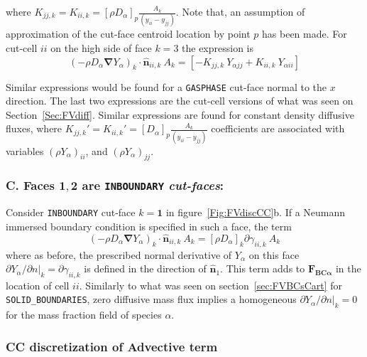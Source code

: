 \documentclass[12pt]{article}
\begin{document}
%
where $K_{jj,k}=K_{ii,k}=[ \rho D_\alpha ]_p \frac{A_k}{(y_{ii}-y_{jj})}$. Note that, an assumption of approximation of the cut-face centroid location by point $p$ has been made. For cut-cell $ii$ on the high side of face $k=3$ the expression is
%
\begin{equation}
  \left( - \rho D_\alpha \boldsymbol{\nabla} Y_\alpha \right)_k \cdot \hat{\mathbf{n}}_{ii,k} \: A_k =
  \left[  -K_{jj,k} \: Y_{\alpha jj} +  K_{ii,k} \: Y_{\alpha ii} \right]
\end{equation}
%

Similar expressions would be found for a \texttt{GASPHASE} cut-face normal to the $x$ direction. The last two expressions are the cut-cell versions of what was seen on Section~\ref{Sec:FVdiff}. Similar expressions are found for constant density diffusive fluxes, where $K_{jj,k}'=K_{ii,k}'=[D_\alpha ]_p \frac{A_k}{(y_{ii}-y_{jj})}$ coefficients are associated with variables $\left( \rho Y_{\alpha} \right)_{ii}$, and $\left( \rho Y_{\alpha} \right)_{jj}$.


\subsubsection*{C. Faces $\mathbf{1},\mathbf{2}$ are \texttt{INBOUNDARY} \textit{cut-faces}:}

Consider \texttt{INBOUNDARY} cut-face $k=\mathbf{1}$ in figure~\ref{Fig:FVdiscCC}b. If a Neumann immersed boundary condition is specified in such a face, the term
%
\begin{equation}
  \left( - \rho D_\alpha \boldsymbol{\nabla} Y_\alpha \right)_k \cdot \hat{\mathbf{n}}_{ii,k} \: A_k = [\rho D_\alpha]_k \partial \gamma_{ii,k} \: A_k
\end{equation}
%
where as before, the prescribed normal derivative of $Y_\alpha$ on this face $\partial Y_\alpha / \partial n |_k=\partial  \gamma_{ii,k}$ is defined in the direction of $\hat{\mathbf{n}}_1$.
This term adds to $\mathbf{F_{BC \alpha}}$ in the location of cell $ii$. Similarly to what was seen on section~\ref{sec:FVBCsCart} for \texttt{SOLID\_BOUNDARIES}, zero diffusive mass flux implies a homogeneous $\partial Y_\alpha / \partial n |_k=0$ for the mass fraction field of species $\alpha$.




\subsubsection{CC discretization of Advective term}
\end{document}

